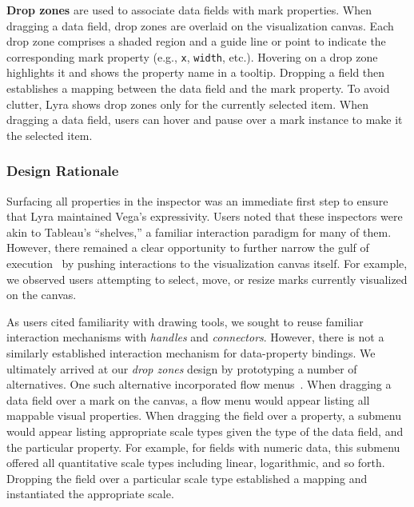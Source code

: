 
\vspace{5pt}
\noindent
\textbf{Drop zones} are used to associate data fields with mark properties. When
dragging a data field, drop zones are overlaid on the visualization canvas. Each
drop zone comprises a shaded region and a guide line or point to indicate the
corresponding mark property (e.g., \texttt{x}, \texttt{width}, etc.). Hovering
on a drop zone highlights it and shows the property name in a tooltip. Dropping
a field then establishes a mapping between the data field and the mark property.
To avoid clutter, Lyra shows drop zones only for the currently selected item.
When dragging a data field, users can hover and pause over a mark instance to
make it the selected item.

\subsubsection{Design Rationale}

Surfacing all properties in the inspector was an immediate first step to ensure
that Lyra maintained Vega's expressivity. Users noted that these inspectors were
akin to Tableau's ``shelves,'' a familiar interaction paradigm for many of them.
However, there remained a clear opportunity to further narrow the gulf of
execution~\cite{hutchins:directmanip} by pushing interactions to the
visualization canvas itself. For example, we observed users attempting to
select, move, or resize marks currently visualized on the canvas.

As users cited familiarity with drawing tools, we sought to reuse familiar
interaction mechanisms with \emph{handles} and \emph{connectors}. However, there
is not a similarly established interaction mechanism for data-property bindings.
We ultimately arrived at our \emph{drop zones} design by prototyping a number of
alternatives. One such alternative incorporated flow
menus~\cite{guimbretiere:flowmenu}. When dragging a data field over a mark on
the canvas, a flow menu would appear listing all mappable visual properties.
When dragging the field over a property, a submenu would appear listing
appropriate scale types given the type of the data field, and the particular
property. For example, for fields with numeric data, this submenu offered all
quantitative scale types including linear, logarithmic, and so forth. Dropping
the field over a particular scale type established a mapping and instantiated
the appropriate scale.

